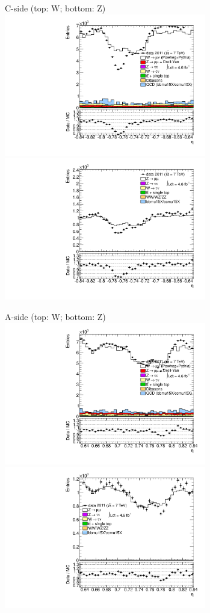 {

\colb[T]

C-side (top: W; bottom: Z)
\centering
\includegraphics[width=0.66\textwidth]{dates/20130306/figures/etaphi/W_4_C_stack_l_eta_NEG} \\
\includegraphics[width=0.66\textwidth]{dates/20130306/figures/etaphi/Z_4_C_stack_lN_eta_ALL.pdf}

A-side (top: W; bottom: Z)
\centering
\includegraphics[width=0.66\textwidth]{dates/20130306/figures/etaphi/W_4_A_stack_l_eta_NEG} \\
\includegraphics[width=0.66\textwidth]{dates/20130306/figures/etaphi/Z_4_A_stack_lN_eta_ALL.pdf} 

\cole
}


